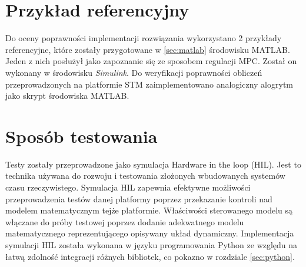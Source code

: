 \section{Przykład referencyjny} \label{sec:ref}
Do oceny poprawności implementacji rozwiązania wykorzystano 2 przykłady referencyjne, które zostały
przygotowane w \ref{sec:matlab} środowisku MATLAB. Jeden z nich posłużył jako zapoznanie się ze
sposobem regulacji MPC. Został on wykonany w środowisku \textit{Simulink}. 
Do weryfikacji poprawności obliczeń przeprowadzonych na platformie STM zaimplementowano analogiczny
alogrytm jako skrypt środowiska MATLAB.  

\section{Sposób testowania} \label{sec:tests}
Testy zostały przeprowadzone jako symulacja Hardware in the loop (HIL). Jest to technika używana
do rozwoju i testowania złożonych wbudowanych systemów czasu rzeczywistego. Symulacja HIL zapewnia
efektywne możliwości przeprowadzenia testów danej platformy poprzez przekazanie kontroli nad 
modelem matematycznym tejże platformie. Właściwości sterowanego modelu są włączane do próby testowej
poprzez dodanie adekwatnego modelu matematycznego reprezentującego opisywany układ dynamiczny. 
Implementacja symulacji HIL została wykonana w języku programowania Python ze względu na łatwą
zdolność integracji różnych bibliotek, co pokazno w rozdziale \ref{sec:python}. 


